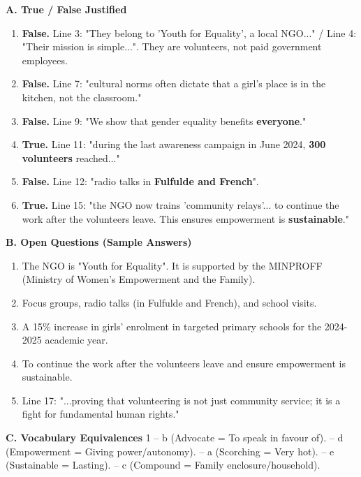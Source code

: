 \documentclass[11pt]{article}
\newcommand{\cle}[1]{{\popxbold\color{popdark}#1}}
\begin{document}
\begin{corrige}
\textbf{A. True / False Justified}
\begin{enumerate}
    \item \textbf{False.} Line 3: "They belong to 'Youth for Equality', a local NGO..." / Line 4: "Their mission is simple...". They are volunteers, not paid government employees.
    \item \textbf{False.} Line 7: "cultural norms often dictate that a girl's place is in the kitchen, not the classroom."
    \item \textbf{False.} Line 9: "We show that gender equality benefits \textbf{everyone}."
    \item \textbf{True.} Line 11: "during the last awareness campaign in June 2024, \textbf{300 volunteers} reached..."
    \item \textbf{False.} Line 12: "radio talks in \textbf{Fulfulde and French}". 
    \item \textbf{True.} Line 15: "the NGO now trains 'community relays'... to continue the work after the volunteers leave. This ensures empowerment is \textbf{sustainable}."
\end{enumerate}

\textbf{B. Open Questions (Sample Answers)}
\begin{enumerate}
    \item The NGO is "Youth for Equality". It is supported by the MINPROFF (Ministry of Women's Empowerment and the Family).
    \item Focus groups, radio talks (in Fulfulde and French), and school visits.
    \item A 15\% increase in girls' enrolment in targeted primary schools for the 2024-2025 academic year.
    \item To continue the work after the volunteers leave and ensure empowerment is sustainable.
    \item Line 17: "...proving that volunteering is not just community service; it is a fight for fundamental human rights."
\end{enumerate}

\textbf{C. Vocabulary Equivalences}
1 -- b (\cle{Advocate} = To speak in favour of).  -- d (\cle{Empowerment} = Giving power/autonomy).  -- a (\cle{Scorching} = Very hot).  -- e (\cle{Sustainable} = Lasting).  -- c (\cle{Compound} = Family enclosure/household).
\end{corrige}
\end{document}
